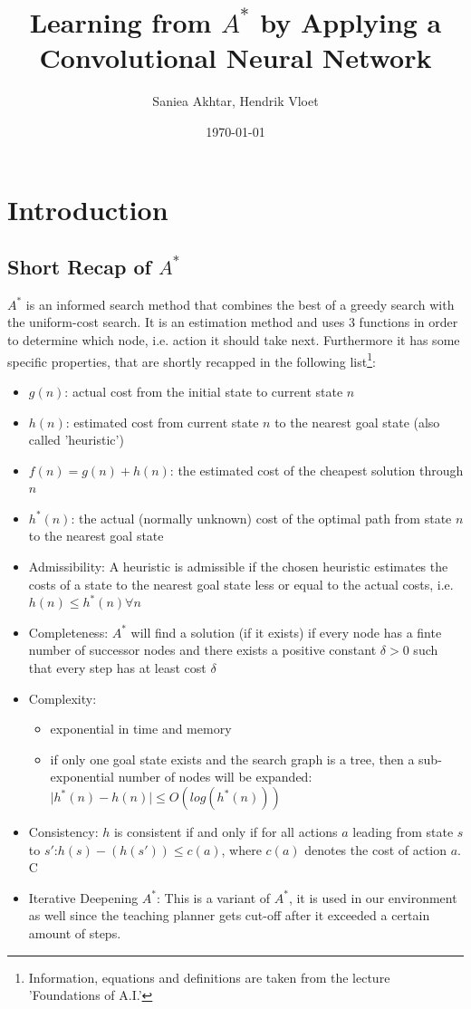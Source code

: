 \documentclass[a4paper]{article}
\title{Learning from $A^*$ by Applying a Convolutional Neural Network}
\author{Saniea Akhtar, Hendrik Vloet}
\date{\today}
\begin{document}
\maketitle
\section{Introduction}

\subsection{Short Recap of $A^*$}

$A^*$ is an informed search method that combines the best of a greedy search with the uniform-cost search. It is an estimation method and uses 3 functions in order to determine which node, i.e. action it should take next. Furthermore it has some specific properties, that are shortly recapped in the following list\footnote{Information, equations and definitions are taken from the lecture 'Foundations of A.I.'}:
\begin{itemize}
\item $g(n)$: actual cost from the initial state to current state $n$
\item $h(n)$: estimated cost from current state $n$ to the nearest goal state (also called 'heuristic')
\item $f(n) = g(n)+h(n)$: the estimated cost of the cheapest solution through $n$
\item $h^*(n)$: the actual (normally unknown) cost of the optimal path from state $n$ to the nearest goal state
\item Admissibility: A heuristic is admissible if the chosen heuristic estimates the costs of a state to the nearest goal state less or equal to the actual costs, i.e. $h(n) \leq h^*(n) \forall n$
\item Completeness: $A^*$ will find a solution (if it exists) if every node has a finte number of successor nodes and there exists a positive constant $\delta > 0$ such that every step has at least cost $\delta$
\item Complexity: 
\begin{itemize}
\item exponential in time and memory
\item if only one goal state exists and the search graph is a tree, then a sub-exponential number of nodes will be expanded: $\vert h^*(n) - h(n) \vert \leq O(log(h^*(n)))$
\end{itemize}
\item Consistency: $h$ is consistent if and only if for all actions $a$ leading from state $s$ to $s'$:$h(s)-(h(s')) \leq c(a)$, where $c(a)$ denotes the cost of action $a$. C
\item Iterative Deepening $A^*$: This is a variant of $A^*$, it is used in our environment as well since the teaching planner gets cut-off after it exceeded a certain amount of steps.
\end{itemize}
\end{document}
